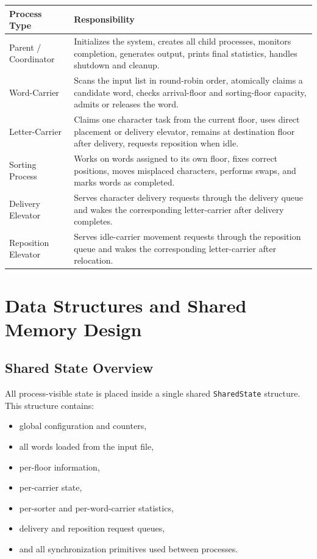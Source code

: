 \documentclass[12pt,a4paper]{article}
\begin{document}
\begin{longtable}{|P{3.8cm}|P{11.2cm}|}
\hline
\textbf{Process Type} & \textbf{Responsibility} \\
\hline
Parent / Coordinator & Initializes the system, creates all child processes, monitors completion, generates output, prints final statistics, handles shutdown and cleanup. \\
\hline
Word-Carrier & Scans the input list in round-robin order, atomically claims a candidate word, checks arrival-floor and sorting-floor capacity, admits or releases the word. \\
\hline
Letter-Carrier & Claims one character task from the current floor, uses direct placement or delivery elevator, remains at destination floor after delivery, requests reposition when idle. \\
\hline
Sorting Process & Works on words assigned to its own floor, fixes correct positions, moves misplaced characters, performs swaps, and marks words as completed. \\
\hline
Delivery Elevator & Serves character delivery requests through the delivery queue and wakes the corresponding letter-carrier after delivery completes. \\
\hline
Reposition Elevator & Serves idle-carrier movement requests through the reposition queue and wakes the corresponding letter-carrier after relocation. \\
\hline
\end{longtable}

\section{Data Structures and Shared Memory Design}

\subsection{Shared State Overview}

All process-visible state is placed inside a single shared \texttt{SharedState} structure. This structure contains:

\begin{itemize}[leftmargin=1.5em]
\item global configuration and counters,
\item all words loaded from the input file,
\item per-floor information,
\item per-carrier state,
\item per-sorter and per-word-carrier statistics,
\item delivery and reposition request queues,
\item and all synchronization primitives used between processes.
\end{itemize}
\end{document}
